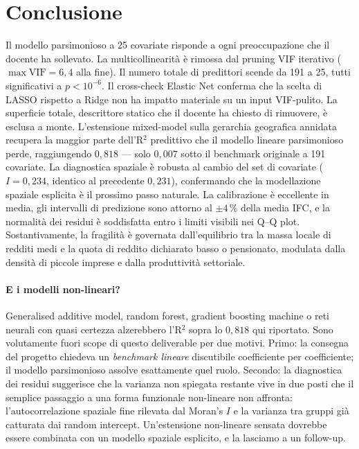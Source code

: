 \documentclass[11pt,a4paper]{article}
\begin{document}
\section{Conclusione}

Il modello parsimonioso a 25 covariate risponde a ogni
preoccupazione che il docente ha sollevato. La multicollinearit\`a
\`e rimossa dal pruning VIF iterativo ($\max\mathrm{VIF}=6{,}4$
alla fine). Il numero totale di predittori scende da 191 a 25,
tutti significativi a $p < 10^{-6}$. Il cross-check Elastic Net
conferma che la scelta di LASSO rispetto a Ridge non ha impatto
materiale su un input VIF-pulito. La superficie totale, descrittore
statico che il docente ha chiesto di rimuovere, \`e esclusa a monte.
L'estensione mixed-model sulla gerarchia geografica annidata
recupera la maggior parte dell'R$^{2}$ predittivo che il modello
lineare parsimonioso perde, raggiungendo $0{,}818$ --- solo
$0{,}007$ sotto il benchmark originale a 191 covariate. La
diagnostica spaziale \`e robusta al cambio del set di covariate
($I = 0{,}234$, identico al precedente $0{,}231$), confermando che
la modellazione spaziale esplicita \`e il prossimo passo naturale.
La calibrazione \`e eccellente in media, gli intervalli di
predizione sono attorno al $\pm 4\,\%$ della media IFC, e la
normalit\`a dei residui \`e soddisfatta entro i limiti visibili nei
Q--Q plot. Sostantivamente, la fragilit\`a \`e governata
dall'equilibrio tra la massa locale di redditi medi e la quota di
reddito dichiarato basso o pensionato, modulata dalla densit\`a di
piccole imprese e dalla produttivit\`a settoriale.

\paragraph{E i modelli non-lineari?}
Generalised additive model, random forest, gradient boosting machine
o reti neurali con quasi certezza alzerebbero l'R$^{2}$ sopra lo
$0{,}818$ qui riportato. Sono volutamente fuori scope di questo
deliverable per due motivi. Primo: la consegna del progetto chiedeva
un \emph{benchmark lineare} discutibile coefficiente per coefficiente;
il modello parsimonioso assolve esattamente quel ruolo. Secondo: la
diagnostica dei residui suggerisce che la varianza non spiegata
restante vive in due posti che il semplice passaggio a una forma
funzionale non-lineare non affronta: l'autocorrelazione spaziale
fine rilevata dal Moran's $I$ e la varianza tra gruppi gi\`a
catturata dai random intercept. Un'estensione non-lineare sensata
dovrebbe essere combinata con un modello spaziale esplicito, e la
lasciamo a un follow-up.
\end{document}
